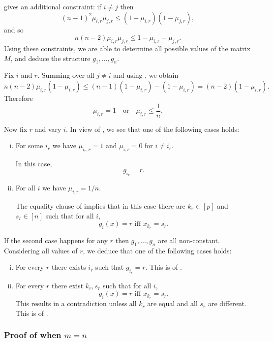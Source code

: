 \documentclass{article}
\theoremstyle{definition}
\theoremstyle{remark}
\begin{document}
 gives an additional constraint: if $i \neq j$ then
\[
 (n - 1)^2 \mu_{i,r} \mu_{j,r} \leq (1 - \mu_{i,r}) (1 - \mu_{j,r}),
\]
and so
\begin{equation} \label{eq:prod-ub}
 n (n - 2) \mu_{i,r} \mu_{j,r} \leq 1 - \mu_{i,r} - \mu_{j,r}.
\end{equation}
Using these constraints, we are able to determine all possible values of the matrix $M$, and deduce the structure $g_1,\dots,g_n$.

Fix $i$ and $r$. Summing  over all $j \neq i$ and using , we obtain
\[
 n(n - 2) \mu_{i,r} (1 - \mu_{i,r}) \leq (n - 1)(1 - \mu_{i,r}) - (1 - \mu_{i,r}) = (n - 2)(1 - \mu_{i,r}).
\]
Therefore
\[
 \mu_{i,r} = 1 \quad \text{or} \quad \mu_{i,r} \leq \frac{1}{n}.
\]

Now fix $r$ and vary $i$. In view of , we see that one of the following cases holds:
\begin{enumerate}[(i)]
\item For some $i_r$ we have $\mu_{i_r,r} = 1$ and $\mu_{i,r} = 0$ for $i \neq i_r$.

In this case,
\[
 g_{i_r} = r.
\]

\item For all $i$ we have $\mu_{i,r} = 1/n$.

The equality clause of  implies that in this case there are $k_r \in [p]$ and $s_r \in [n]$ such that for all $i$,
\[
 g_i(x) = r \text{ iff } x_{k_r} = s_r.
\]
\end{enumerate}

If the second case happens for any $r$ then $g_1,\dots,g_n$ are all non-constant. Considering all values of $r$, we deduce that one of the following cases holds:
\begin{enumerate}[(i)]
\item For every $r$ there exists $i_r$ such that $g_{i_r} = r$. This is  of .

\item For every $r$ there exist $k_r,s_r$ such that for all $i$,
\[
 g_i(x) = r \text{ iff } x_{k_r} = s_r.
\]
This results in a contradiction unless all $k_r$ are equal and all $s_r$ are different. This is  of .
\end{enumerate}

\subsubsection{Proof of \texorpdfstring{}{Theorem \ref{thm:main}} when \texorpdfstring{$m = n$}{m = n}}
\label{sec:Perm-approx-poly}
\end{document}
